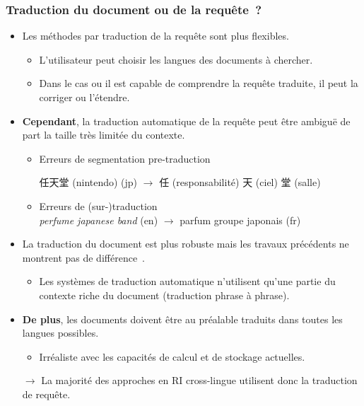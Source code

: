 \documentclass[12pt,aspectratio=43,dvipsnames,table]{beamer}
\begin{document}
\begin{frame}[allowframebreaks]
    \frametitle{Traduction du document ou de la requête~?}
    \begin{itemize} \itemsep10pt
        \item Les méthodes par traduction de la requête sont plus flexibles.
        \begin{itemize}
            \item L'utilisateur peut choisir les langues des documents à
                  chercher.
            \item Dans le cas ou il est capable de comprendre la requête 
                  traduite, il peut la corriger ou l'étendre.
        \end{itemize}
        \item \textbf{Cependant}, la traduction automatique de la requête peut 
              être ambiguë de part la taille très limitée du contexte.
        \begin{itemize}
            \item Erreurs de segmentation pre-traduction \\
                  \begin{CJK}{UTF8}{min}
                  任天堂 (nintendo) (jp) $\to$  任 (responsabilité) 天 (ciel) 
                  堂 (salle)
                  \end{CJK}
            \item Erreurs de (sur-)traduction \\
                  \textit{perfume japanese band} (en) $\to$ parfum groupe 
                  japonais (fr)        
        \end{itemize}

        \framebreak

        \item La traduction du document est plus robuste mais les travaux 
              précédents ne montrent pas de différence~\cite{McCarley:1999}.
        \begin{itemize}
            \item Les systèmes de traduction automatique n'utilisent qu'une 
                  partie du contexte riche du document (traduction phrase à 
                  phrase).
        \end{itemize}
        \item \textbf{De plus}, les documents doivent être au préalable traduits
              dans toutes les langues possibles.
        \begin{itemize}
            \item Irréaliste avec les capacités de calcul et de stockage 
                  actuelles.
        \end{itemize}
        \item[$\to$] La majorité des approches en RI cross-lingue utilisent donc
                     la traduction de requête.
    \end{itemize}
\end{frame}
\end{document}

